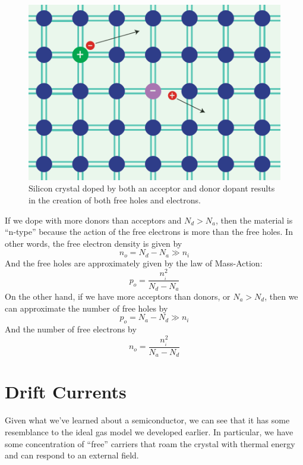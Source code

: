 \begin{figure}[tb]
\begin{center}
\includegraphics[width=.5\columnwidth]{silicon_dopant_both}
\end{center}
\caption{Silicon crystal doped by both an acceptor and donor dopant results in the creation of both free holes and electrons. } \label{fig:silicon_dopant_both}
\end{figure}


If we dope with more donors than acceptors and $N_d > N_a$, then the material is “n-type” because the action of the free electrons is more than the free holes.  In other words, the free electron density is given by
%
\begin{equation}
        {n_o} = {N_d} - {N_a} \gg {n_i}
\end{equation}
%
And the free holes are approximately given by the law of Mass-Action:
%
\begin{equation}
        {p_o} = \frac{{n_{_i}^2}}{{{N_d} - {N_a}}}
\end{equation}
%
On the other hand, if we have more acceptors than donors, or  $N_a > N_d$, then we can approximate the number of free holes by
%
\begin{equation}
        {p_o} = {N_a} - {N_d} \gg {n_i}
\end{equation}
%
And the number of free electrons by
%
\begin{equation}
        {n_o} = \frac{{n_{_i}^2}}{{{N_a} - {N_d}}}
\end{equation}
%




\section{Drift Currents}


Given what we’ve learned about a semiconductor, we can see that it has some resemblance to the ideal gas model we developed earlier.  In particular, we have some concentration of “free” carriers that roam the crystal with thermal energy and can respond to an external field.  


